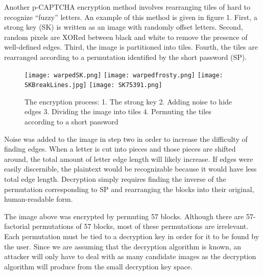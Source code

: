 \documentclass[12pt]{article}
\begin{document}
	Another p-CAPTCHA encryption method involves rearranging tiles of hard to recognize “fuzzy” letters. An example of this method is given in figure 1. First, a strong key (SK) is written as an image with randomly offset letters. Second, random pixels are XORed between black and white to remove the presence of well-defined edges. Third, the image is partitioned into tiles. Fourth, the tiles are rearranged according to a permutation identified by the short password (SP).

\begin{figure}
	\texttt{[image: warpedSK.png]}
	\texttt{[image: warpedfrosty.png]}
	\texttt{[image: SKBreakLines.jpg]}
	\texttt{[image: SK75391.png]}
	\caption{The encryption process: 1. The strong key 2. Adding noise to hide edges 3. Dividing the image into tiles 4. Permuting the tiles according to a short password}
\label{warpedSK}
\end{figure}


	Noise was added to the image in step two in order to increase the difficulty of finding edges. When a letter is cut into pieces and those pieces are shifted around, the total amount of letter edge length will likely increase. If edges were easily discernible, the plaintext would be recognizable because it would have less total edge length. Decryption simply requires finding the inverse of the permutation corresponding to SP and rearranging the blocks into their original, human-readable form.

	The image above was encrypted by permuting 57 blocks. Although there are 57-factorial permutations of 57 blocks, most of these permutations are irrelevant. Each permutation must be tied to a decryption key in order for it to be found by the user. Since we are assuming that the decryption algorithm is known, an attacker will only have to deal with as many candidate images as the decryption algorithm will produce from the small decryption key space.
\end{document}
